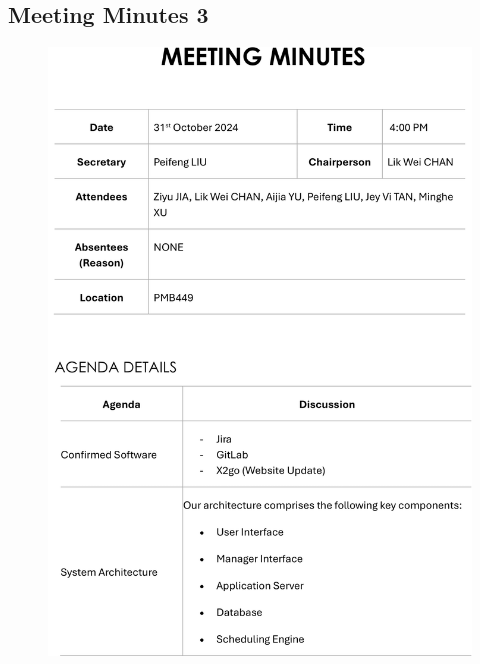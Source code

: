 \documentclass[a4paper,12pt, oneside]{report}
\begin{document}
\begin{appendices}
\section{Meeting Minutes 3}
\begin{figure}[H]
    \centering
    \includegraphics[width=\textwidth]{Minutes/Minutes_3-cropped-1.png}
\end{figure}
\newpage
\begin{figure}[H]
    \centering

\end{figure}
\end{appendices}
\end{document}
